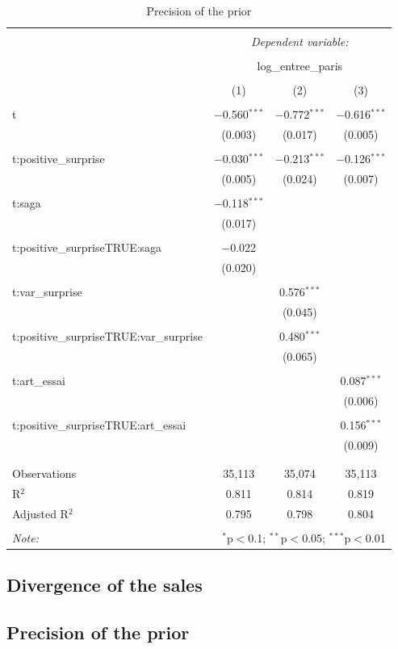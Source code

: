 \begin{table}[!htbp] \centering 
	\caption{Precision of the prior} 
	\label{} 
	\begin{tabular}{@{\extracolsep{5pt}}lccc} 
		\\[-1.8ex]\hline 
		\hline \\[-1.8ex] 
		& \multicolumn{3}{c}{\textit{Dependent variable:}} \\ 
		\cline{2-4} 
		\\[-1.8ex] & \multicolumn{3}{c}{log\_entree\_paris} \\ 
		\\[-1.8ex] & (1) & (2) & (3)\\ 
		\hline \\[-1.8ex] 
		t & $-$0.560$^{***}$ & $-$0.772$^{***}$ & $-$0.616$^{***}$ \\ 
		& (0.003) & (0.017) & (0.005) \\ 
		& & & \\ 
		t:positive\_surprise & $-$0.030$^{***}$ & $-$0.213$^{***}$ & $-$0.126$^{***}$ \\ 
		& (0.005) & (0.024) & (0.007) \\ 
		& & & \\ 
		t:saga & $-$0.118$^{***}$ &  &  \\ 
		& (0.017) &  &  \\ 
		& & & \\ 
		t:positive\_surpriseTRUE:saga & $-$0.022 &  &  \\ 
		& (0.020) &  &  \\ 
		& & & \\ 
		t:var\_surprise &  & 0.576$^{***}$ &  \\ 
		&  & (0.045) &  \\ 
		& & & \\ 
		t:positive\_surpriseTRUE:var\_surprise &  & 0.480$^{***}$ &  \\ 
		&  & (0.065) &  \\ 
		& & & \\ 
		t:art\_essai &  &  & 0.087$^{***}$ \\ 
		&  &  & (0.006) \\ 
		& & & \\ 
		t:positive\_surpriseTRUE:art\_essai &  &  & 0.156$^{***}$ \\ 
		&  &  & (0.009) \\ 
		& & & \\ 
		\hline \\[-1.8ex] 
		Observations & 35,113 & 35,074 & 35,113 \\ 
		R$^{2}$ & 0.811 & 0.814 & 0.819 \\ 
		Adjusted R$^{2}$ & 0.795 & 0.798 & 0.804 \\ 
		\hline 
		\hline \\[-1.8ex] 
		\textit{Note:}  & \multicolumn{3}{r}{$^{*}$p$<$0.1; $^{**}$p$<$0.05; $^{***}$p$<$0.01} \\ 
	\end{tabular} 
\end{table} 
\subsection{Divergence of the sales}\label{subsec2.2}
\subsection{Precision of the prior}\label{subsec2.3}
